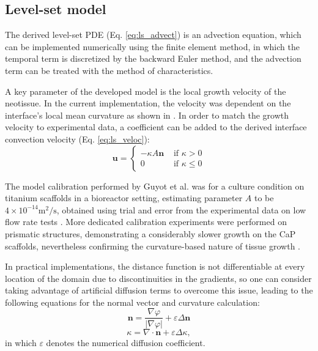 \subsection{Level-set model}

The derived level-set \gls{PDE} (Eq. \ref{eq:ls_advect}) is an advection equation, which can be implemented numerically using the finite element method, in which the temporal term is discretized by the backward Euler method, and the advection term can be treated with the method of characteristics.

A key parameter of the developed model is the local growth velocity of the neotissue. In the current implementation, the velocity was dependent on the interface's local mean curvature as shown in \cite{Bidan2012a,Guyot2014}. In order to match the growth velocity to experimental data, a coefficient can be added to the derived interface convection velocity (Eq. \ref{eq:ls_veloc}):
\begin{equation} \label{eq:ls_veloc2}
\boldsymbol{u}=\left\{\begin{array}{ll}
-\kappa A \boldsymbol{n} & \text { if } \kappa>0 \\
0 & \text { if } \kappa \leq 0
\end{array}\right.
\end{equation}

The model calibration performed by Guyot et al. \cite{Guyot2014} was for a culture condition on titanium scaffolds in a bioreactor setting, estimating parameter $A$ to be $4\times10^{-14} \text{m}^2/\text{s}$, obtained using trial and error from the experimental data on low flow rate tests \cite{Papantoniou2014}.
More dedicated calibration experiments were performed on prismatic structures, demonstrating a considerably slower growth on the CaP scaffolds, nevertheless confirming the curvature-based nature of tissue growth \cite{Hede2021}.

In practical implementations, the distance function is not differentiable at every location of the domain due to discontinuities in the gradients, so one can consider taking advantage of artificial diffusion terms to overcome this issue, leading to the following equations for the normal vector and curvature calculation:
\begin{equation}
\boldsymbol{n}=\frac{\nabla \varphi}{|\nabla \varphi|}+\varepsilon \Delta \boldsymbol{n}
\end{equation}
\begin{equation}
\kappa=\nabla \cdot \boldsymbol{n}+\varepsilon \Delta \kappa,
\end{equation}
in which $\varepsilon$ denotes the numerical diffusion coefficient.


